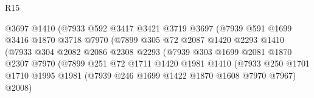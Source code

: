 \begin{lexlean}{R15}
\begin{coremodule}
                                      @3697
                                      @1410
                                      (@7933
                                        @592
                                        @3417
                                        @3421
                                        @3719
                                        @3697
                                        (@7939
                                          @591
                                          @1699
                                          @3416
                                          @1870
                                          @3718
                                          @7970
                                          (@7899
                                            @305
                                            @72
                                            @2087
                                            @1420
                                            @2293
                                            @1410
                                            (@7933
                                              @304
                                              @2082
                                              @2086
                                              @2308
                                              @2293
                                              (@7939
                                                @303
                                                @1699
                                                @2081
                                                @1870
                                                @2307
                                                @7970
                                                (@7899
                                                  @251
                                                  @72
                                                  @1711
                                                  @1420
                                                  @1981
                                                  @1410
                                                  (@7933
                                                    @250
                                                    @1701
                                                    @1710
                                                    @1995
                                                    @1981
                                                    (@7939 @246 @1699 @1422 @1870 @1608 @7970 @7967)
                                                    @2008)

\end{coremodule}
\end{lexlean}
